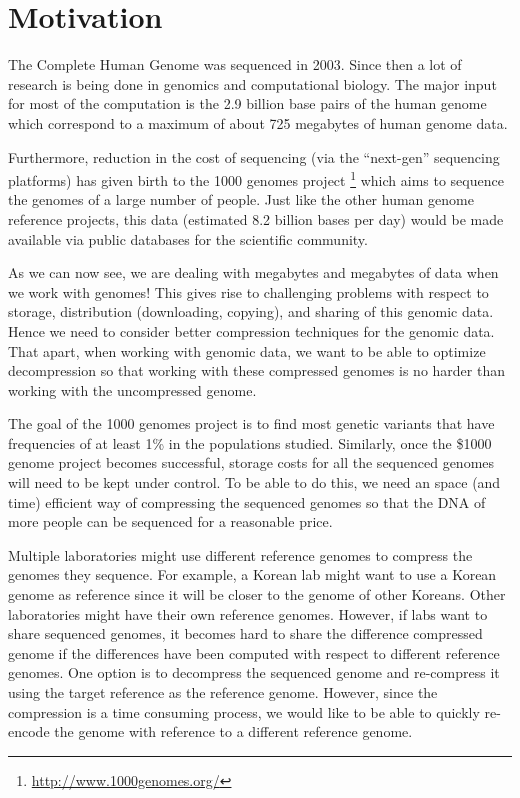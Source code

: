 \documentclass[11pt]{article}
\begin{document}
\clearpage

\tableofcontents

\setlength{\parskip}{1.9ex plus 0.5ex minus 0.2ex}

\clearpage

\section{Motivation}

The Complete Human Genome was sequenced in 2003. Since then a lot of
research is being done in genomics and computational biology. The
major input for most of the computation is the 2.9 billion base pairs
\cite{howmuchsequenced}\cite{findinghumangenome} of the human genome
which correspond to a maximum of about 725 megabytes of human
genome data.\cite{wikipediahumangenome}

Furthermore, reduction in the cost of sequencing (via the ``next-gen''
sequencing platforms) has given birth to the 1000 genomes project
\footnote{\url{http://www.1000genomes.org/}} which aims to sequence
the genomes of a large number of people. Just like the other human
genome reference projects, this data (estimated 8.2 billion bases per
day) would be made available via public databases for the scientific
community.\cite{1000genomes}

As we can now see, we are dealing with megabytes and megabytes of data 
when we work with genomes! This gives rise to challenging 
problems with respect to storage, distribution (downloading, copying), 
and sharing of this genomic data. Hence we need to consider better 
compression techniques for the genomic data. That apart, when working
with genomic data, we want to be able to optimize decompression so
that working with these compressed genomes is no harder than working
with the uncompressed genome.

The goal of the 1000 genomes project is to find most genetic variants
that have frequencies of at least 1\% in the populations
studied. Similarly, once the \$1000 genome
project\cite{1000dollargenomeproject} becomes successful, storage
costs for all the sequenced genomes will need to be kept under
control. To be able to do this, we need an space (and time) efficient
way of compressing the sequenced genomes so that the DNA of more
people can be sequenced for a reasonable price.

Multiple laboratories might use different reference genomes to
compress the genomes they sequence. For example, a Korean lab might
want to use a Korean genome as reference since it will be closer to
the genome of other Koreans. Other laboratories might have their own
reference genomes. However, if labs want to share sequenced genomes,
it becomes hard to share the difference compressed genome if the
differences have been computed with respect to different reference
genomes. One option is to decompress the sequenced genome and
re-compress it using the target reference as the reference
genome. However, since the compression is a time consuming process, we
would like to be able to quickly re-encode the genome with reference
to a different reference genome.
\end{document}
